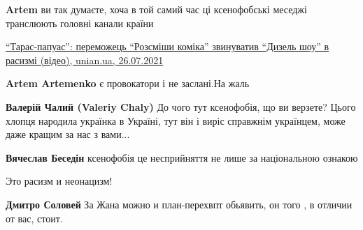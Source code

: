 \begin{itemize}
\begin{itemize}
\textbf{Artem} ви так думаєте, хоча в той самий час ці ксенофобські меседжі транслюють головні канали країни

\href{https://www.unian.ua/lite/stars/taras-papuas-peremozhec-rozsmishi-komika-zvinuvativ-dizel-shou-v-rasizmi-video-11493601.html}{%
\enquote{Тарас-папуас}: переможець \enquote{Розсміши коміка} звинуватив \enquote{Дизель шоу} в расизмі (відео), unian.ua, 26.07.2021%
}

 
\textbf{Artem Artemenko} є провокатори і не заслані.На жаль

 
\textbf{Валерій Чалий (Valeriy Chaly)} До чого тут ксенофобія, що ви верзете?
Цього хлопця народила українка в Україні, тут він і виріс справжнім українцем,
може даже кращим за нас з вами...

 
\textbf{Вячеслав Беседін} ксенофобія це несприйняття не лише за національною ознакою

 
Это расизм и неонацизм!

 
\textbf{Дмитро Соловей} За Жана можно и план-перехвпт обьявить, он того , в отличии от вас, стоит.


\end{itemize}
\end{itemize}
